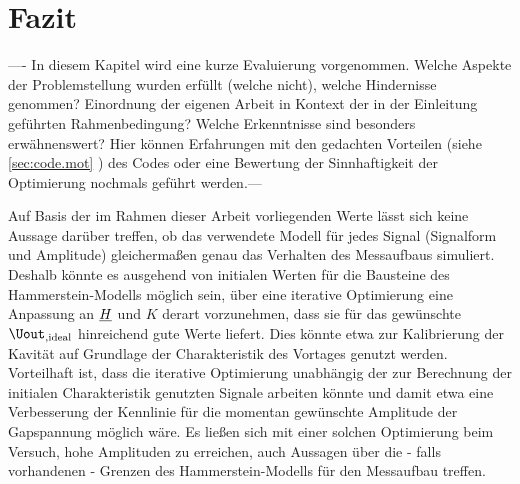 \documentclass[../Report.tex]{subfiles}
\begin{document}
\chapter{Fazit}
\label{chap:fazit}
---- In diesem Kapitel wird eine kurze Evaluierung vorgenommen. Welche Aspekte der Problemstellung wurden erfüllt (welche nicht), welche Hindernisse genommen? Einordnung der eigenen Arbeit in Kontext der in der Einleitung geführten Rahmenbedingung? Welche Erkenntnisse sind besonders erwähnenswert? Hier können Erfahrungen mit den gedachten Vorteilen (siehe \ref{sec:code.mot} ) des Codes oder eine Bewertung der Sinnhaftigkeit der Optimierung nochmals geführt werden.--- 


Auf Basis der im Rahmen dieser Arbeit vorliegenden Werte lässt sich keine Aussage darüber treffen, ob das verwendete Modell für jedes Signal (Signalform und Amplitude) gleichermaßen genau das Verhalten des Messaufbaus simuliert.
Deshalb könnte es ausgehend von initialen Werten für die Bausteine des Hammerstein-Modells möglich sein, über eine iterative Optimierung eine Anpassung an $\underline{H}$ und $K$ derart vorzunehmen, dass sie für das gewünschte $\Uout_{, \mathrm{ideal}}$ hinreichend gute Werte liefert. Dies könnte etwa zur Kalibrierung der Kavität auf Grundlage der Charakteristik des Vortages genutzt werden. Vorteilhaft ist, dass die iterative Optimierung unabhängig der zur Berechnung der initialen Charakteristik genutzten Signale arbeiten könnte und damit etwa eine Verbesserung der Kennlinie für die momentan gewünschte Amplitude der Gapspannung möglich wäre.
Es ließen sich mit einer solchen Optimierung beim Versuch, hohe Amplituden zu erreichen, auch Aussagen über die - falls vorhandenen - Grenzen des Hammerstein-Modells für den Messaufbau treffen.
\end{document}
